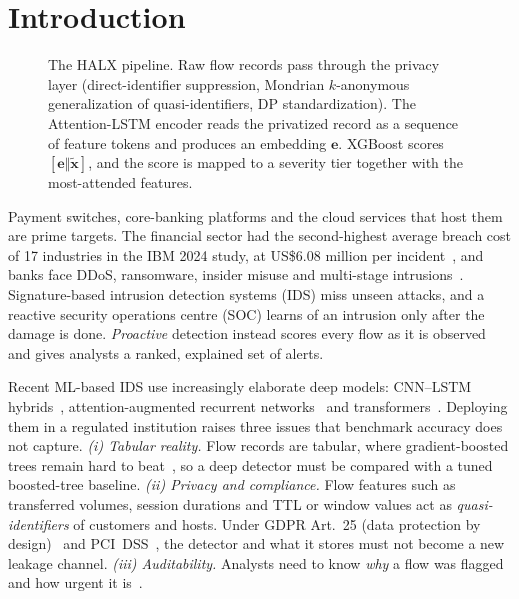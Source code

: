 \section{Introduction}
\begin{figure}[t]
\centering
\resizebox{0.97\textwidth}{!}{}
\caption{The HALX pipeline. Raw flow records pass through the privacy layer
(direct-identifier suppression, Mondrian $k$-anonymous generalization of
quasi-identifiers, DP standardization). The Attention-LSTM encoder reads the
privatized record as a sequence of feature tokens and produces an embedding
$\mathbf{e}$. XGBoost scores $[\mathbf{e}\Vert\tilde{\mathbf{x}}]$, and the score is
mapped to a severity tier together with the most-attended features.}
\label{fig:architecture}
\end{figure}
Payment switches, core-banking platforms and the cloud services that host
them are prime targets. The financial sector had the second-highest
average breach cost of 17 industries in the IBM 2024 study, at
US\$6.08 million per incident~\cite{ibm2024breach}, and banks face DDoS,
ransomware, insider misuse and multi-stage
intrusions~\cite{asmar2024banks,islam2022ddosbank}. Signature-based
intrusion detection systems (IDS) miss unseen attacks, and a reactive
security operations centre (SOC) learns of an intrusion only after the damage
is done. \emph{Proactive} detection instead scores every flow as it is
observed and gives analysts a ranked, explained set of alerts.

Recent ML-based IDS use increasingly elaborate deep models: CNN--LSTM
hybrids~\cite{halbouni2022cnnlstm,altunay2023cnnlstm}, attention-augmented
recurrent networks~\cite{alashjaee2025attn} and
transformers~\cite{wu2022rtids,manocchio2024flowtransformer,akuthota2025iot}.
Deploying them in a regulated institution raises three issues that
benchmark accuracy does not capture.
\textit{(i) Tabular reality.} Flow records are tabular, where
gradient-boosted trees remain hard to beat~\cite{grinsztajn2022tree}, so a
deep detector must be compared with a tuned boosted-tree baseline. \textit{(ii) Privacy and compliance.} Flow
features such as transferred volumes, session durations and TTL or window
values act as \emph{quasi-identifiers} of customers and hosts. Under GDPR
Art.~25 (data protection by design)~\cite{gdpr2016} and PCI~DSS~\cite{pcidss4},
the detector and what it stores must not become a new leakage channel. \textit{(iii) Auditability.} Analysts need to know \emph{why} a flow
was flagged and how urgent it is~\cite{neupane2022xids}.

